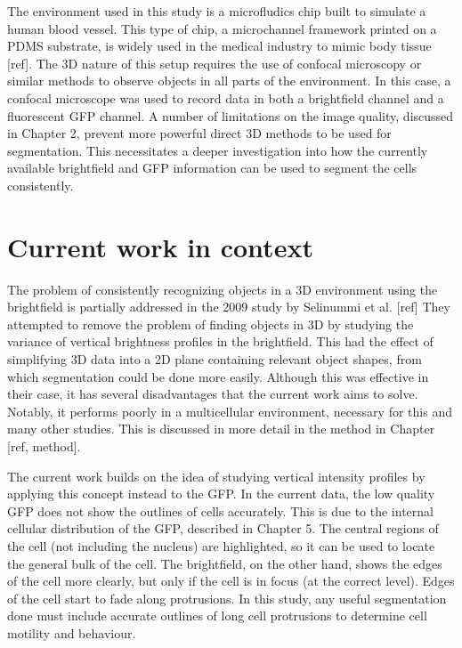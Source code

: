 The environment used in this study is a microfludics chip built to simulate a human blood vessel. This type of chip, a microchannel framework printed on a PDMS substrate, is widely used in the medical industry to mimic body tissue [ref]. The 3D nature of this setup requires the use of confocal microscopy or similar methods to observe objects in all parts of the environment. In this case, a confocal microscope was used to record data in both a brightfield channel and a fluorescent GFP channel. A number of limitations on the image quality, discussed in Chapter 2, prevent more powerful direct 3D methods to be used for segmentation. This necessitates a deeper investigation into how the currently available brightfield and GFP information can be used to segment the cells consistently.

\section{Current work in context}

The problem of consistently recognizing objects in a 3D environment using the brightfield is partially addressed in the 2009 study by Selinummi et al. [ref] They attempted to remove the problem of finding objects in 3D by studying the variance of vertical brightness profiles in the brightfield. This had the effect of simplifying 3D data into a 2D plane containing relevant object shapes, from which segmentation could be done more easily. Although this was effective in their case, it has several disadvantages that the current work aims to solve. Notably, it performs poorly in a multicellular environment, necessary for this and many other studies. This is discussed in more detail in the method in Chapter [ref, method].

The current work builds on the idea of studying vertical intensity profiles by applying this concept instead to the GFP. In the current data, the low quality GFP does not show the outlines of cells accurately. This is due to the internal cellular distribution of the GFP, described in Chapter 5. The central regions of the cell (not including the nucleus) are highlighted, so it can be used to locate the general bulk of the cell. The brightfield, on the other hand, shows the edges of the cell more clearly, but only if the cell is in focus (at the correct level). Edges of the cell start to fade along protrusions. In this study, any useful segmentation done must include accurate outlines of long cell protrusions to determine cell motility and behaviour.

